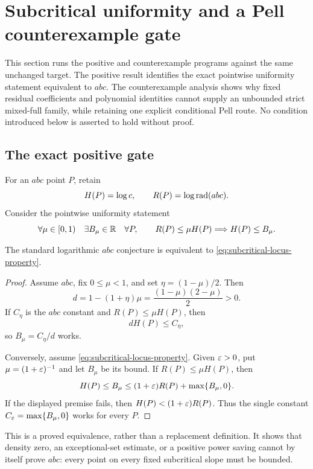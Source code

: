 \section{Subcritical uniformity and a Pell counterexample gate}
\label{sec:dual-subcritical-pell}

This section runs the positive and counterexample programs against the same
unchanged target.  The positive result identifies the exact pointwise
uniformity statement equivalent to $abc$.  The counterexample analysis shows
why fixed residual coefficients and polynomial identities cannot supply an
unbounded strict mixed-full family, while retaining one explicit conditional
Pell route.  No condition introduced below is asserted to hold without proof.

\subsection{The exact positive gate}

For an $abc$ point $P$, retain
\[
             H(P)=\log c,\qquad R(P)=\log\operatorname{rad}(abc).
\]
Consider the pointwise uniformity statement
\begin{equation}\label{eq:subcritical-locus-property}
 \forall\mu\in[0,1)\quad\exists B_\mu\in\mathbb R\quad\forall P,
 \qquad R(P)\leq\mu H(P)\Longrightarrow H(P)\leq B_\mu.
\end{equation}

\begin{theorem}
\label{thm:subcritical-locus-equivalence}
The standard logarithmic $abc$ conjecture is equivalent to
\eqref{eq:subcritical-locus-property}.
\end{theorem}

\begin{proof}
Assume $abc$, fix $0\leq\mu<1$, and set
$\eta=(1-\mu)/2$.  Then
\[
 d=1-(1+\eta)\mu=\frac{(1-\mu)(2-\mu)}2>0.
\]
If $C_\eta$ is the $abc$ constant and $R(P)\leq\mu H(P)$, then
\[
 dH(P)\leq C_\eta,
\]
so $B_\mu=C_\eta/d$ works.

Conversely, assume \eqref{eq:subcritical-locus-property}.  Given
$\varepsilon>0$, put $\mu=(1+\varepsilon)^{-1}$ and let $B_\mu$ be its bound.  If
$R(P)\leq\mu H(P)$, then
\[
 H(P)\leq B_\mu\leq(1+\varepsilon)R(P)+\max\{B_\mu,0\}.
\]
If the displayed premise fails, then
$H(P)<(1+\varepsilon)R(P)$.  Thus the single constant
$C_\varepsilon=\max\{B_\mu,0\}$ works for every $P$.
\end{proof}

This is a proved equivalence, rather than a replacement definition.  It
shows that density zero, an exceptional-set estimate, or a positive power
saving cannot by itself prove $abc$: every point on every fixed
subcritical slope must be bounded.

